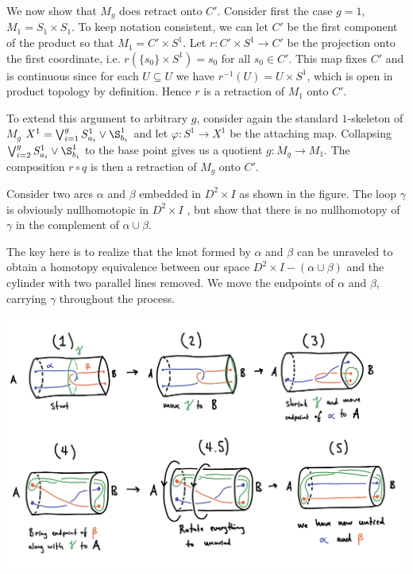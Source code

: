 \begin{homework}[e]
\begin{prf}
    We now show that $M_g$ does retract onto $C'$. Consider first the case $g = 1$, $M_1 = S_1\times S_1$. To keep notation consistent, we can let $C'$ be the first component of the product so that $M_1 = C'\times S^1$. Let $r:C'\times S^1\to C'$ be the projection onto the first coordinate, i.e. $r(\{s_0\}\times S^1) = s_0$ for all $s_0 \in C'$. This map fixes $C'$ and is continuous since for each $U \subseteq U$ we have $r^{-1}(U) = U\times S^1$, which is open in product topology by definition. Hence $r$ is a retraction of $M_1$ onto $C'$.

    To extend this argument to arbitrary $g$, consider again the standard $1$-skeleton of $M_g$ $X^1 = \bigvee_{i=1}^g S^1_{a_i}\vee \S^1_{b_i}$ and let $\varphi:S^1\to X^1$ be the attaching map. Collapsing $\bigvee_{i=2}^g S^1_{a_i}\vee \S^1_{b_i}$ to the base point gives us a quotient $g:M_g\to M_1$. The composition $r\circ q$ is then a retraction of $M_g$ onto $C'$.
  \end{prf}
   Consider two arcs $\alpha$ and $\beta$ embedded in $D^2 \times I$ as shown in the figure. The loop $\gamma$ is obviously nullhomotopic in $D^2\times I$ , but show that there is no nullhomotopy of $\gamma$ in the complement of $\alpha \cup \beta$.
  \begin{prf}
    The key here is to realize that the knot formed by $\alpha$ and $\beta$ can be unraveled to obtain a homotopy equivalence between our space $D^2\times I - (\alpha \cup \beta)$ and the cylinder with two parallel lines removed. We move the endpoints of $\alpha$ and $\beta$, carrying $\gamma$ throughout the process.
    \begin{center}
      \includegraphics[width=15cm]{figures/hwk4-fig1.jpg}

\end{center}
\end{prf}
\end{homework}

